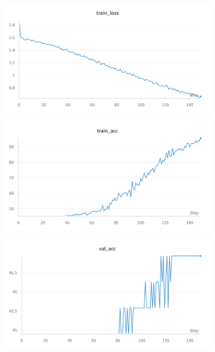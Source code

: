 \documentclass{article}
\begin{document}
\begin{figure}[t]
    \centering

    \begin{minipage}{0.6\textwidth}
        \centering
        \includegraphics[width=\textwidth]{Images/cnn1_train_loss.png}
        \label{fig:cnn1_train_loss}
    \end{minipage}

    \vspace*{0.4cm}

    \begin{minipage}{0.6\textwidth}
        \centering
        \includegraphics[width=\textwidth]{Images/cnn1_train_acc.png}
        \label{fig:cnn1_train_acc}
    \end{minipage}

    \vspace*{0.4cm}

    \begin{minipage}{0.6\textwidth}
        \centering
        \includegraphics[width=\textwidth]{Images/cnn1_val_acc.png}
        \label{fig:cnn1_val_acc}
    \end{minipage}


\end{figure}
\end{document}
